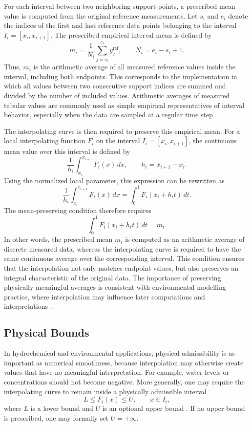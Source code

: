 \documentclass[12pt,a4paper]{article}
\begin{document}
For each interval between two neighboring support points, a prescribed mean value is computed from the original reference measurements. Let \(s_i\) and \(e_i\) denote the indices of the first and last reference data points belonging to the interval \(I_i=[x_i,x_{i+1}]\). The prescribed empirical interval mean is defined by
\[
m_i=
\frac{1}{N_i}
\sum_{j=s_i}^{e_i}
y_j^{\mathrm{ref}},
\qquad
N_i=e_i-s_i+1.
\]
Thus, \(m_i\) is the arithmetic average of all measured reference values inside the interval, including both endpoints. This corresponds to the implementation in which all values between two consecutive support indices are summed and divided by the number of included values. Arithmetic averages of measured tabular values are commonly used as simple empirical representatives of interval behavior, especially when the data are sampled at a regular time step \cite{krylyk2013computational,gnauck2004waterquality}.

The interpolating curve is then required to preserve this empirical mean. For a local interpolating function \(F_i\) on the interval \(I_i=[x_i,x_{i+1}]\), the continuous mean value over this interval is defined by
\[
\frac{1}{h_i}
\int_{x_i}^{x_{i+1}} F_i(x)\,dx,
\qquad
h_i=x_{i+1}-x_i.
\]
Using the normalized local parameter, this expression can be rewritten as
\[
\frac{1}{h_i}
\int_{x_i}^{x_{i+1}} F_i(x)\,dx
=
\int_0^1 F_i(x_i+h_i t)\,dt.
\]
The mean-preserving condition therefore requires
\[
\int_0^1 F_i(x_i+h_i t)\,dt=m_i.
\]
In other words, the prescribed mean \(m_i\) is computed as an arithmetic average of discrete measured data, whereas the interpolating curve is required to have the same continuous average over the corresponding interval. This condition ensures that the interpolation not only matches endpoint values, but also preserves an integral characteristic of the original data. The importance of preserving physically meaningful averages is consistent with environmental modelling practice, where interpolation may influence later computations and interpretations \cite{kokhan2013geoinformation,piatkova2019dem}.

\subsection{Physical Bounds}

In hydrochemical and environmental applications, physical admissibility is as important as numerical smoothness, because interpolation may otherwise create values that have no meaningful interpretation. For example, water levels or concentrations should not become negative. More generally, one may require the interpolating curve to remain inside a physically admissible interval
\[
L\leq F_i(x)\leq U,
\qquad x\in I_i,
\]
where \(L\) is a lower bound and \(U\) is an optional upper bound \cite{kokhan2013geoinformation,gnauck2004waterquality}. If no upper bound is prescribed, one may formally set \(U=+\infty\).
\end{document}
